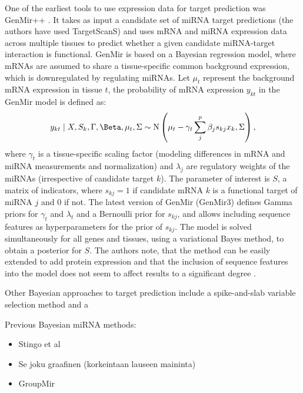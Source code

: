 One of the earliest tools to use expression data for target prediction was
GenMir++ \citep{Huang2007}. It takes as input a candidate set of miRNA target predictions (the authors
have used TargetScanS) and uses mRNA and miRNA expression data across multiple tissues
to predict whether a given candidate miRNA-target interaction is functional.
GenMir is based on a Bayesian regression model, where
mRNAs are assumed to share a tissue-specific common background expression,
which is downregulated by regulating miRNAs. Let $\mu_t$ represent the
background mRNA expression in tissue $t$, the probability of mRNA expression
$y_{kt}$ in the GenMir model is defined as:
\begin{equation}
  y_{kt} \mid X, S_k, \Gamma, \Beta, \mu_t, \Sigma \sim \textup{N} \left( \mu_t - \gamma_t \sum_j^p \beta_j s_{kj} x_k, \Sigma \right),
\end{equation}
where $\gamma_t$ is a tissue-specific scaling factor (modeling differences in
mRNA and miRNA measurements and normalization) and $\lambda_j$ are regulatory
weights of the miRNAs (irrespective of candidate target $k$). The parameter of
interest is $S$, a matrix of indicators, where $s_{kj}=1$ if candidate mRNA
$k$ is a functional target of miRNA $j$ and $0$ if not. The latest version of
GenMir (GenMir3) defines Gamma priors for $\gamma_t$ and $\lambda_t$ and a
Bernoulli prior for $s_{kj}$, and allows including sequence features as
hyperparameters for the prior of $s_{kj}$. The model is solved simultaneously
for all genes and tissues, using a variational Bayes method, to obtain a
posterior for $S$. The authors note, that the method can be easily extended to
add protein expression and that the inclusion of sequence features into the
model does not seem to affect results to a significant degree \citep{}.

Other Bayesian approaches to target prediction include a spike-and-slab variable
selection method \citep{Stingo} and a 

Previous Bayesian miRNA methods:
\begin{itemize}
  \item Stingo et al
  \item Se joku graafinen (korkeintaan lauseen maininta)
  \item GroupMir
\end{itemize}
